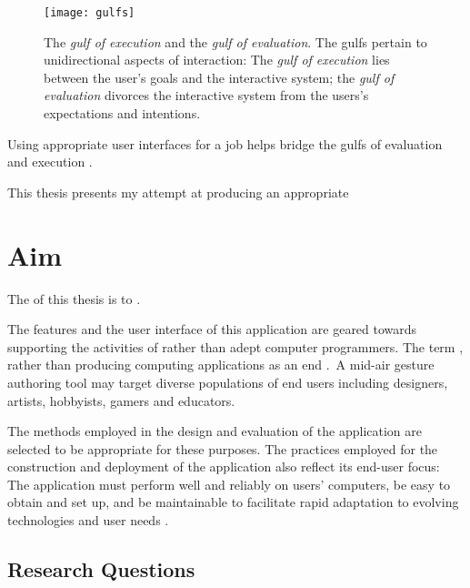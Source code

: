 \begin{SCfigure}[\sidecaptionrelwidth][ht]
\centering
\texttt{[image: gulfs]}
\caption{The \emph{gulf of execution} and the \emph{gulf of evaluation}. The gulfs pertain to unidirectional aspects of interaction: The \emph{gulf of execution} lies between the user's goals and the interactive system; the \emph{gulf of evaluation} divorces the interactive system from the users's expectations and intentions.}
\label{fig:gulfs}
\end{SCfigure}

Using appropriate user interfaces for a job helps bridge the gulfs of evaluation and execution \parencite{Norman:2002}.

This thesis presents my attempt at producing an appropriate 

\section{Aim} %

The  of this thesis is to .

The features and the user interface of this application are geared towards supporting the activities of  rather than adept computer programmers. The term , rather than producing computing applications as an end \parencite{Ko:2011}.\ A mid-air gesture authoring tool may target diverse populations of end users including designers, artists, hobbyists, gamers and educators.

The methods employed in the design and evaluation of the application are selected to be appropriate for these purposes. The practices employed for the construction and deployment of the application also reflect its end-user focus: The application must perform well and reliably on users' computers, be easy to obtain and set up, and be maintainable to facilitate rapid adaptation to evolving technologies and user needs \parencite{McConnell:2009, Brooks:1995}.

\subsection{Research Questions} %

